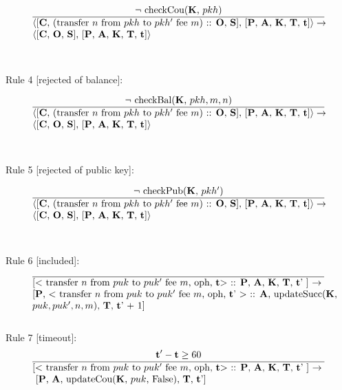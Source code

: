 \documentclass[a4paper]{llncs}
\begin{document}
\begin{equation}{}
\frac{\text{$\neg$ checkCou(\MANAGERS, $pkh$)}}{\parbox{4.2in}{\text{$\langle$[\ACCOUNTS, (transfer $n$ from $pkh$ to $pkh'$ fee $m$) :: \OPERATIONS, \CONTRACTS], [\PENDING, \ACCEPTED, \MANAGERS, \CONTRACTORS, \TIME]$\rangle \rightarrow$ }\\
\text{$\langle$[\ACCOUNTS, \OPERATIONS, \CONTRACTS], [\PENDING, \ACCEPTED, \MANAGERS, \CONTRACTORS, \TIME]$\rangle$}}} 
\end{equation}
~\\
~\\
Rule 4 [rejected of balance]:

\begin{equation}{}
\frac{\text{$\neg$ checkBal(\MANAGERS, $pkh, m, n$)}}{\parbox{4.2in}{\text{$\langle$[\ACCOUNTS, (transfer $n$ from $pkh$ to $pkh'$ fee $m$) :: \OPERATIONS, \CONTRACTS], [\PENDING, \ACCEPTED, \MANAGERS, \CONTRACTORS, \TIME]$\rangle \rightarrow$ }\\
\text{$\langle$[\ACCOUNTS, \OPERATIONS, \CONTRACTS], [\PENDING, \ACCEPTED, \MANAGERS, \CONTRACTORS, \TIME]$\rangle$}}} 
\end{equation}
~\\
~\\
Rule 5 [rejected of public key]:

\begin{equation}{}
\frac{\text{$\neg$ checkPub(\MANAGERS, $pkh'$)}}{\parbox{4.2in}{\text{$\langle$[\ACCOUNTS, (transfer $n$ from $pkh$ to $pkh'$ fee $m$) :: \OPERATIONS, \CONTRACTS], [\PENDING, \ACCEPTED, \MANAGERS, \CONTRACTORS, \TIME]$\rangle \rightarrow$ }\\
\text{$\langle$[\ACCOUNTS, \OPERATIONS, \CONTRACTS], [\PENDING, \ACCEPTED, \MANAGERS, \CONTRACTORS, \TIME]$\rangle$}}} 
\end{equation}
~\\
~\\
Rule 6 [included]:
\begin{equation}{}
\frac{}{\parbox{4.2in}{\text{[$<$ transfer $n$ from $puk$ to  $puk'$ fee $m$, oph, \TIME $>$ :: \PENDING, \ACCEPTED, \MANAGERS, \CONTRACTORS, \TIME' ] $\rightarrow$ } \\
 \text{[\PENDING, $<$ transfer $n$ from  $puk$ to $puk'$ fee $m$, oph, \TIME' $>$ :: \ACCEPTED, updateSucc(\MANAGERS, } \\
\text{$puk, puk', n, m$), \CONTRACTORS, \TIME' + 1]}}} 
\end{equation}
~\\
Rule 7 [timeout]:
\begin{equation}{}
\frac{\TIME' - \TIME \ge 60}{\parbox{4.2in}{\text{[$<$ transfer $n$ from $puk$ to  $puk'$ fee $m$, oph, \TIME $>$ :: \PENDING, \ACCEPTED, \MANAGERS, \CONTRACTORS, \TIME' ] $\rightarrow$} \\
 \hspace*{0cm} \text{[\PENDING, \ACCEPTED, updateCou(\MANAGERS, $puk$, False), \CONTRACTORS, \TIME']}}} 
\end{equation}
\end{document}

